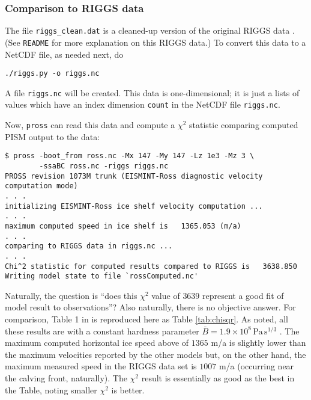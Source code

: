 \subsubsection*{Comparison to RIGGS data}  The file \texttt{riggs_clean.dat} is a cleaned-up version of the original RIGGS data \cite{RIGGS1, RIGGS2}.  (See \texttt{README} for more explanation on this RIGGS data.)  To convert this data to a NetCDF file, as needed next, do

\begin{verbatim}
./riggs.py -o riggs.nc
\end{verbatim}
A file \texttt{riggs.nc} will be created.  This data is one-dimensional; it is just a lists of values which have an index dimension \texttt{count} in the NetCDF file \texttt{riggs.nc}.

Now, \texttt{pross} can read this data and compute a $\chi^2$ statistic comparing computed PISM output to the data:

\small
\begin{verbatim}
$ pross -boot_from ross.nc -Mx 147 -My 147 -Lz 1e3 -Mz 3 \
        -ssaBC ross.nc -riggs riggs.nc
PROSS revision 1073M trunk (EISMINT-Ross diagnostic velocity computation mode)
. . .
initializing EISMINT-Ross ice shelf velocity computation ... 
. . .
maximum computed speed in ice shelf is   1365.053 (m/a)
. . .
comparing to RIGGS data in riggs.nc ...
. . .
Chi^2 statistic for computed results compared to RIGGS is   3638.850
Writing model state to file `rossComputed.nc'
\end{verbatim}
\normalsize

Naturally, the question is ``does this $\chi^2$ value of $3639$ represent a good fit of model result to observations''?  Also naturally, there is no objective answer.  For comparison, Table 1 in \cite{MacAyealetal} is reproduced here as Table \ref{tab:chisqr}.  As noted, all these results are with a constant hardness parameter $\bar B = 1.9 \times 10^8 \, \text{Pa}\, \text{s}^{1/3}$ \cite{MacAyealetal}. The maximum computed horizontal ice speed above of $1365$ m/a is slightly lower than the maximum velocities reported by the other models but, on the other hand, the maximum measured speed in the RIGGS data set is $1007$ m/a (occurring near the calving front, naturally).  The $\chi^2$ result is essentially as good as the best in the Table, noting smaller $\chi^2$ is better.

